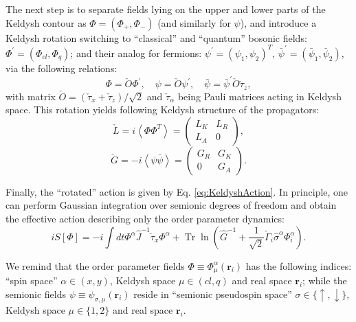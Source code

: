 \documentclass[twocolumn,english,prb]{revtex4-1}
\newcommand{\Tr}{\operatorname{Tr}}
\begin{document}
The next step is to separate fields lying on the upper and lower parts of the Keldysh contour as $\Phi = (\Phi_{+}, \Phi_{-})$ (and similarly for $\psi$), and introduce a Keldysh rotation switching to ``classical'' and ``quantum'' bosonic fields: $\Phi^\prime = (\Phi_{cl}, \Phi_q)$; and their analog for fermions: $\psi^\prime = (\psi_1, \psi_2)^T$, $\bar{\psi}^\prime = (\bar{\psi}_1, \bar{\psi}_2)$, via the following relations:
\begin{equation}
\Phi = \check{O} \Phi^\prime,\quad \psi = \check{O} \psi^\prime,\quad \bar{\psi} = \bar{\psi}^\prime \check{O}\check{\tau}_z,
\end{equation}
with matrix $\check{O} = (\check{\tau}_x + \check{\tau}_z) / \sqrt{2}$ and $\check{\tau}_\alpha$ being Pauli matrices acting in Keldysh space. This rotation yields following Keldysh structure of the propagators:
\begin{equation}
\check{L} = i \left\langle \Phi \Phi^T \right \rangle = \begin{pmatrix}L_{K} & L_{R}\\
L_{A} & 0
\end{pmatrix},
\end{equation}
\begin{equation}
\check{G} = -i \left\langle \psi \bar{\psi}\right\rangle = \begin{pmatrix}G_{R} & G_{K}\\
0 & G_{A}
\end{pmatrix}.
\end{equation}

Finally, the ``rotated'' action is given by Eq. \eqref{eq:KeldyshAction}. In principle, one can perform Gaussian integration over semionic degrees of freedom and obtain the effective action describing only the order parameter dynamics:
\begin{equation}
i S[\Phi] = -i\int dt \Phi^{\alpha}\hat{J}^{-1}\check{\tau}_{x}\Phi^{\alpha}+\Tr\ln\left(\hat{G}^{-1}+\frac{1}{\sqrt{2}}\check{\Gamma}_{i}\hat{\sigma}^{\alpha}\Phi_{i}^{\alpha}\right).
\end{equation}

We remind that the order parameter fields $\Phi \equiv \Phi^\alpha_\mu(\boldsymbol{r}_i)$ has the following indices: ``spin space'' $\alpha \in (x,y)$, Keldysh space $\mu \in (cl, q)$ and real space $\boldsymbol{r}_i$; 
while the semionic fields $\psi \equiv \psi_{\sigma, \mu}(\boldsymbol{r}_i)$ reside in ``semionic pseudospin space'' $\sigma \in \{\uparrow, \downarrow\}$, Keldysh space $\mu \in \{1,2\}$ and real space $\boldsymbol{r}_i$.
\end{document}
